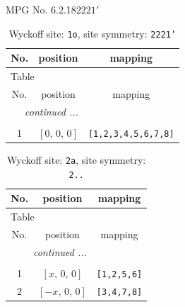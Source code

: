 \documentclass[fleqn,8pt]{jsarticle}
\begin{document}
\setcounter{MaxMatrixCols}{32}

\renewcommand{\tablename}{Table~}
\renewcommand{\figurename}{Figure~}
\begin{center}
\LARGE
MPG No. 6.2.18\quad$2221'$
\end{center}
\renewcommand{\arraystretch}{1.2}
\begin{longtable}{ccc}
\caption{Wyckoff site: {\tt 1o}, site symmetry: {\tt 2221'}}
 \\
 \hline \hline
No. & position & mapping \\ \hline \endfirsthead

\multicolumn{2}{l}{\tablename\ \thetable{}} \\
 \hline \hline
No. & position & mapping \\ \hline \endhead

 \hline \hline
\multicolumn{2}{r}{\footnotesize\it continued ...} \\ \endfoot

 \hline \hline
\multicolumn{2}{r}{} \\ \endlastfoot

1 & $\left[ 0,\, 0,\, 0 \right]$ & {\tt [1,2,3,4,5,6,7,8]} \\
\end{longtable}
\renewcommand{\arraystretch}{1.2}
\begin{longtable}{ccc}
\caption{Wyckoff site: {\tt 2a}, site symmetry: {\tt 2..}}
 \\
 \hline \hline
No. & position & mapping \\ \hline \endfirsthead

\multicolumn{2}{l}{\tablename\ \thetable{}} \\
 \hline \hline
No. & position & mapping \\ \hline \endhead

 \hline \hline
\multicolumn{2}{r}{\footnotesize\it continued ...} \\ \endfoot

 \hline \hline
\multicolumn{2}{r}{} \\ \endlastfoot

1 & $\left[ x,\, 0,\, 0 \right]$ & {\tt [1,2,5,6]} \\ \hline
2 & $\left[ - x,\, 0,\, 0 \right]$ & {\tt [3,4,7,8]} \\
\end{longtable}
\renewcommand{\arraystretch}{1.2}
\end{document}
